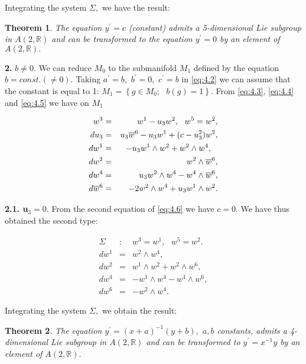 \documentclass{amsproc}
\newtheorem{theorem}{Theorem}[section]
\theoremstyle{remark}
\numberwithin{equation}{section}
\begin{document}
Integrating the system $\Sigma ,$ we have the result:

\begin{theorem}
The equation $y^{\prime }=c$ (constant) admits a 5-dimensional Lie subgroup
in $A(2,\mathbb{R}
)$ and can be transformed to the equation $y^{\prime }=0$ by an element of $A(2,\mathbb{R}
).$
\end{theorem}

\textbf{2. }$b\neq 0.$ We can reduce $M_{0}$ to the submanifold $M_{1}$
defined by the equation $b=const.(\neq 0).$ Taking $a^{\prime }=b,$ $b^{\prime }=0,$ $c^{\prime }=b$ in \eqref{eq:4.2} we can assume that the constant
is equal to 1: $M_{1}=\left\{ g\in M_{0};\text{ }b(g)=1\right\} .$ From \eqref{eq:4.3},
 \eqref{eq:4.4} and \eqref{eq:4.5} we have on $M_{1}$

\begin{eqnarray}
w^{3} &=&w^{1}-u_{3}w^{2},\text{ \ }w^{5}=w^{2}, \notag \\
du_{3} &=&u_{3}\overline{w}^{6}-u_{3}w^{1}+(c-u_{3}^{2})w^{2}, \notag \\
dw^{1} &=&-u_{3}w^{1}\wedge w^{2}+w^{2}\wedge w^{4},
   \label{eq:4.6}
    \text{\ \ } \\
dw^{2} &=&w^{2}\wedge \overline{w}^{6}, \notag \\
dw^{4} &=&u_{3}w^{2}\wedge w^{4}-w^{4}\wedge \overline{w}^{6}, \notag \\
d\overline{w}^{6} &=&-2w^{2}\wedge w^{4}+u_{3}w^{1}\wedge w^{2}. \notag
\end{eqnarray}

\textbf{2.1. u}$_{3}=0.$ From the second equation of \eqref{eq:4.6} we have $c=0.$
We have thus obtained the second type:

\begin{eqnarray*}
\Sigma &:&w^{3}=w^{1},\text{ \ }w^{5}=w^{2}. \\
dw^{1} &=&w^{2}\wedge w^{4}, \\
dw^{2} &=&w^{1}\wedge w^{2}+w^{2}\wedge w^{6}, \\
dw^{4} &=&-w^{1}\wedge w^{4}-w^{4}\wedge w^{6}, \\
dw^{6} &=&-w^{2}\wedge w^{4}.
\end{eqnarray*}

Integrating the system $\Sigma ,$ we obtain the result:

\begin{theorem}
The equation $y^{\prime }=(x+a)^{-1}(y+b),$ $a,b$ constants, admits a
4-dimensional Lie subgroup in $A(2,\mathbb{R}
)$ and can be transformed to $y^{\prime }=x^{-1}y$ by an element of $A(2,\mathbb{R}
).$
\end{theorem}
\end{document}
